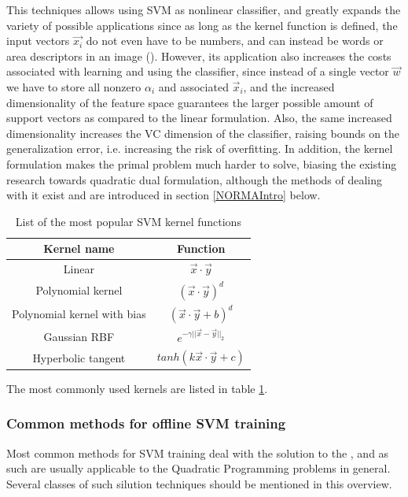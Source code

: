 This techniques allows using SVM as nonlinear classifier, and greatly expands the  variety of possible applications since as long as the kernel function is defined, the input vectors $\vec{x_i}$ do not even have to be numbers, and can instead be words or area descriptors in an image (\cite{bertelli2011kernelized}). However, its application also increases the costs associated with learning and using the classifier, since instead of a single vector $\vec{w}$ we have to store all nonzero $\alpha_i$ and associated $\vec{x}_i$, and the increased dimensionality of the feature space guarantees the larger possible amount of support vectors as compared to the linear formulation. Also, the same increased dimensionality increases the VC dimension of the classifier, raising bounds on the generalization error, i.e. increasing the risk of overfitting. In addition, the kernel formulation makes the primal problem much harder to solve, biasing the existing research towards quadratic dual formulation, although the methods of dealing with it exist and are introduced in  section \ref{NORMAIntro} below.
\begin{table}
\centering
    \begin{tabular}{|c|c|}
        \hline
        Kernel name                 & Function \\ \hline
        Linear                      & $\vec{x}\cdot \vec{y}$       \\ \hline
        Polynomial kernel           & $(\vec{x}\cdot \vec{y})^d$        \\ \hline
        Polynomial kernel with bias & $(\vec{x}\cdot \vec{y}+b)^d$        \\ \hline
        Gaussian RBF                & $e^{-\gamma||\vec{x}-\vec{y}||_2}$         \\  \hline
        Hyperbolic tangent          & $tanh(k\vec{x}\cdot \vec{y}+c)$        \\
        \hline
    \end{tabular}
\caption[List of SVM kernel functions]{List of the most popular SVM kernel functions}
\label{Kernels}
\end{table}
The most commonly used kernels are listed in table \ref{Kernels}.



\subsubsection{Common methods for offline SVM training}
Most common methods for SVM training deal with the solution to the , and as such are usually applicable to the Quadratic Programming problems in general. Several classes of such silution techniques should be mentioned in this overview. 

